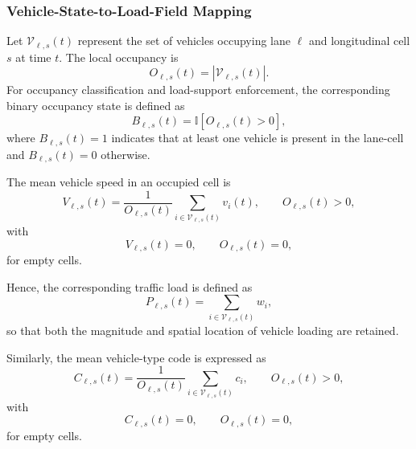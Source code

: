 \documentclass[journal]{IEEEtran}
\begin{document}
\subsubsection{Vehicle-State-to-Load-Field Mapping}
\label{subsec:load_field_mapping}

Let $\mathcal{V}_{\ell,s}(t)$ represent the set of vehicles occupying lane $\ell$ and longitudinal cell $s$ at time $t$. The local occupancy is
\begin{equation}
O_{\ell,s}(t) = \left|\mathcal{V}_{\ell,s}(t)\right|.
\label{eq:cell_occupancy}
\end{equation}
For occupancy classification and load-support enforcement, the corresponding binary occupancy state is defined as
\begin{equation}
B_{\ell,s}(t) = \mathbb{I}\left[O_{\ell,s}(t)>0\right],
\label{eq:binary_occupancy}
\end{equation}
where $B_{\ell,s}(t)=1$ indicates that at least one vehicle is present in the lane-cell and $B_{\ell,s}(t)=0$ otherwise.

The mean vehicle speed in an occupied cell is
\begin{equation}
V_{\ell,s}(t) = \frac{1}{O_{\ell,s}(t)}\sum_{i\in\mathcal{V}_{\ell,s}(t)}v_i(t), \qquad O_{\ell,s}(t)>0,
\label{eq:mean_vehicle_speed}
\end{equation}
with
\begin{equation}
V_{\ell,s}(t)=0, \qquad O_{\ell,s}(t)=0,
\label{eq:empty_vehicle_speed}
\end{equation}
for empty cells.

Hence, the corresponding traffic load is defined as
\begin{equation}
P_{\ell,s}(t) = \sum_{i\in\mathcal{V}_{\ell,s}(t)}w_i,
\label{eq:cell_load}
\end{equation}
so that both the magnitude and spatial location of vehicle loading are retained.

Similarly, the mean vehicle-type code is expressed as
\begin{equation}
C_{\ell,s}(t) = \frac{1}{O_{\ell,s}(t)}\sum_{i\in\mathcal{V}_{\ell,s}(t)}c_i, \qquad O_{\ell,s}(t)>0,
\label{eq:mean_vehicle_type}
\end{equation}
with
\begin{equation}
C_{\ell,s}(t)=0, \qquad O_{\ell,s}(t)=0,
\label{eq:empty_vehicle_type}
\end{equation}
for empty cells.
\end{document}
